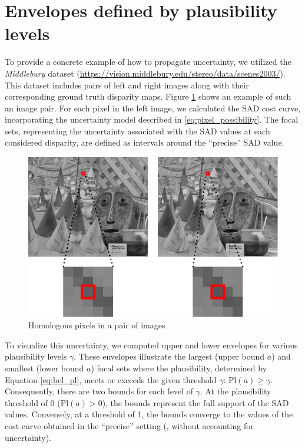 \section{Envelopes defined by plausibility levels}
To provide a concrete example of how to propagate uncertainty, we utilized the \textit{Middlebury} dataset (\url{https://vision.middlebury.edu/stereo/data/scenes2003/}). This dataset includes pairs of left and right images along with their corresponding ground truth disparity maps. Figure \ref{fig:Cones} shows an example of such an image pair.
For each pixel in the left image, we calculated the SAD cost curve, incorporating the uncertainty model described in \eqref{eq:pixel_possibility}. The focal sets, representing the uncertainty associated with the SAD values at each considered disparity, are defined as intervals around the ``precise'' SAD value.

\begin{figure}[ht]
  \centering
  \includegraphics[width=0.8\linewidth]{Images/Cones.png}
  \caption{Homologous pixels in a pair of images}\label{fig:Cones}
\end{figure}

To visualize this uncertainty, we computed upper and lower envelopes for various plausibility levels $\gamma$. These envelopes illustrate the largest (upper bound $\overline{a}$) and smallest (lower bound $\underline{a}$) focal sets where the plausibility, determined by Equation \eqref{eq:bel_pl}, meets or exceeds the given threshold $\gamma$: $\mathrm{Pl}(\overline{a}) \geqslant \gamma$. Consequently, there are two bounds for each level of $\gamma$.
At the plausibility threshold of 0 ($\mathrm{Pl}(\overline{a}) > 0$), the bounds represent the full support of the SAD values. Conversely, at a threshold of 1, the bounds converge to the values of the cost curve obtained in the ``precise'' setting (\ie, without accounting for uncertainty).


